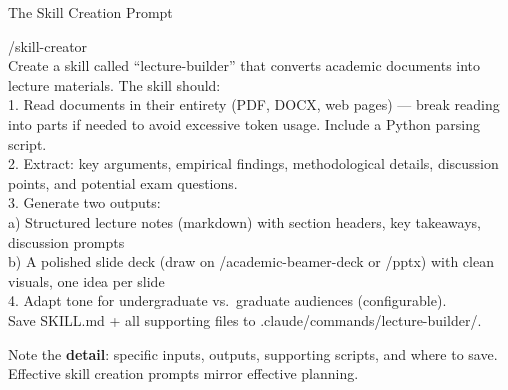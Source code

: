 \documentclass[aspectratio=169, 10pt]{beamer}
\begin{document}
\begin{frame}{The Skill Creation Prompt}
\begin{tcolorbox}[colback=DarkSlate, colframe=DarkSlate, arc=3pt, left=6pt, right=6pt, top=4pt, bottom=4pt]
{\color{CoolGray}\ttfamily\tiny /skill-creator\\[2pt]
\color{white}\tiny
Create a skill called ``lecture-builder'' that converts academic documents into lecture materials. The skill should:\\[1pt]
1. Read documents in their entirety (PDF, DOCX, web pages) --- break reading into parts if needed to avoid excessive token usage. Include a Python parsing script.\\[1pt]
2. Extract: key arguments, empirical findings, methodological details, discussion points, and potential exam questions.\\[1pt]
3. Generate two outputs:\\
\quad a) Structured lecture notes (markdown) with section headers, key takeaways, discussion prompts\\
\quad b) A polished slide deck (draw on /academic-beamer-deck or /pptx) with clean visuals, one idea per slide\\[1pt]
4. Adapt tone for undergraduate vs.\ graduate audiences (configurable).\\[1pt]
Save SKILL.md + all supporting files to .claude/commands/lecture-builder/.
}
\end{tcolorbox}
\vskip4pt
\begin{tcolorbox}[quotebox, width=11cm]
\small Note the \textbf{detail}: specific inputs, outputs, supporting scripts, and where to save. Effective skill creation prompts mirror effective planning.
\end{tcolorbox}
\end{frame}
\end{document}
